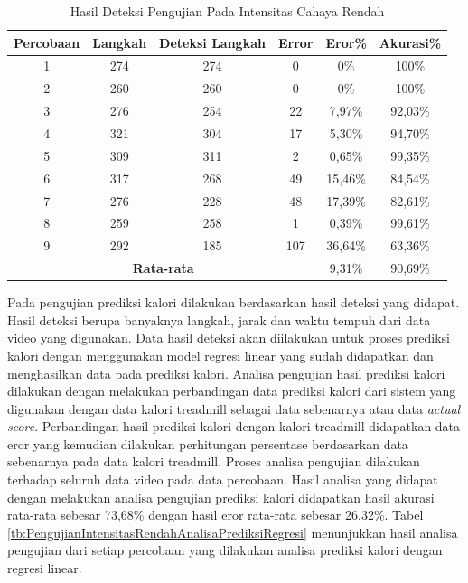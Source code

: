 \begin{longtable}{|c|c|c|c|c|c|}
  \caption{Hasil Deteksi Pengujian Pada Intensitas Cahaya Rendah}
  \label{tb:PengujianIntensitasRendahAnalisaDeteksi}                                   \\
  \hline
  \rowcolor[HTML]{C0C0C0}
  \textbf{Percobaan} & \textbf{Langkah} & \textbf{Deteksi Langkah} & \textbf{Error} & \textbf{Eror\%} & \textbf{Akurasi\%} \\
  \hline
  1   & 274   & 274 & 0    & 0\%       & 100\%   \\
  \hline
  2   & 260   & 260 & 0    & 0\%       & 100\%   \\
  \hline
  3   & 276   & 254 & 22   & 7,97\%    & 92,03\%     \\
  \hline
  4   & 321   & 304 & 17   & 5,30\%    & 94,70\%   \\
  \hline
  5   & 309   & 311 & 2    & 0,65\%    & 99,35\%   \\
  \hline
  6   & 317   & 268 & 49   & 15,46\%   & 84,54\%   \\
  \hline
  7   & 276   & 228 & 48   & 17,39\%   & 82,61\%   \\
  \hline
  8   & 259   & 258 & 1    & 0,39\%    & 99,61\%   \\
  \hline
  9   & 292   & 185 & 107  & 36,64\%   & 63,36\%   \\
  \hline

  \multicolumn{4}{|c|}{\textbf{Rata-rata}} & 9,31\% & 90,69\% \\
  \hline
\end{longtable}

Pada pengujian prediksi kalori dilakukan berdasarkan hasil deteksi yang didapat. Hasil deteksi berupa banyaknya langkah, jarak dan waktu tempuh dari data video yang digunakan. Data hasil deteksi akan diilakukan untuk proses prediksi kalori dengan menggunakan model regresi linear yang sudah didapatkan dan menghasilkan data pada prediksi kalori. Analisa pengujian hasil prediksi kalori dilakukan dengan melakukan perbandingan data prediksi kalori dari sistem yang digunakan dengan data kalori treadmill sebagai data sebenarnya atau data \emph{actual score}. Perbandingan hasil prediksi kalori dengan kalori treadmill didapatkan data eror yang kemudian dilakukan perhitungan persentase berdasarkan data sebenarnya pada data kalori treadmill. Proses analisa pengujian dilakukan terhadap seluruh data video pada data percobaan. Hasil analisa yang didapat dengan melakukan analisa pengujian prediksi kalori didapatkan hasil akurasi rata-rata sebesar 73,68\% dengan hasil eror rata-rata sebesar 26,32\%. Tabel \ref{tb:PengujianIntensitasRendahAnalisaPrediksiRegresi} menunjukkan hasil analisa pengujian dari setiap percobaan yang dilakukan analisa prediksi kalori dengan regresi linear.




